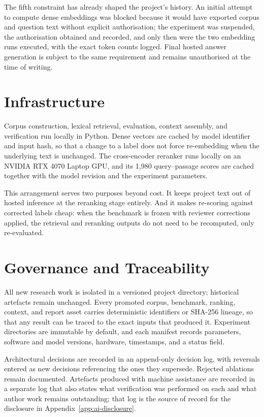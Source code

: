 The fifth constraint has already shaped the project's history. An initial attempt to compute dense embeddings was blocked because it would have exported corpus and question text without explicit authorisation; the experiment was suspended, the authorisation obtained and recorded, and only then were the two embedding runs executed, with the exact token counts logged. Final hosted answer generation is subject to the same requirement and remains unauthorised at the time of writing.

\section{Infrastructure}
\label{sec:context-infra}

Corpus construction, lexical retrieval, evaluation, context assembly, and verification run locally in Python. Dense vectors are cached by model identifier and input hash, so that a change to a label does not force re-embedding when the underlying text is unchanged. The cross-encoder reranker runs locally on an NVIDIA RTX 4070 Laptop \ac{GPU}, and its 1{,}980 query--passage scores are cached together with the model revision and the experiment parameters.

This arrangement serves two purposes beyond cost. It keeps project text out of hosted inference at the reranking stage entirely. And it makes re-scoring against corrected labels cheap: when the benchmark is frozen with reviewer corrections applied, the retrieval and reranking outputs do not need to be recomputed, only re-evaluated.

\section{Governance and Traceability}
\label{sec:context-governance}

All new research work is isolated in a versioned project directory; historical artefacts remain unchanged. Every promoted corpus, benchmark, ranking, context, and report asset carries deterministic identifiers or SHA-256 lineage, so that any result can be traced to the exact inputs that produced it. Experiment directories are immutable by default, and each manifest records parameters, software and model versions, hardware, timestamps, and a status field.

Architectural decisions are recorded in an append-only decision log, with reversals entered as new decisions referencing the ones they supersede. Rejected ablations remain documented. Artefacts produced with machine assistance are recorded in a separate log that also states what verification was performed on each and what author work remains outstanding; that log is the source of record for the disclosure in Appendix~\ref{app:ai-disclosure}.

